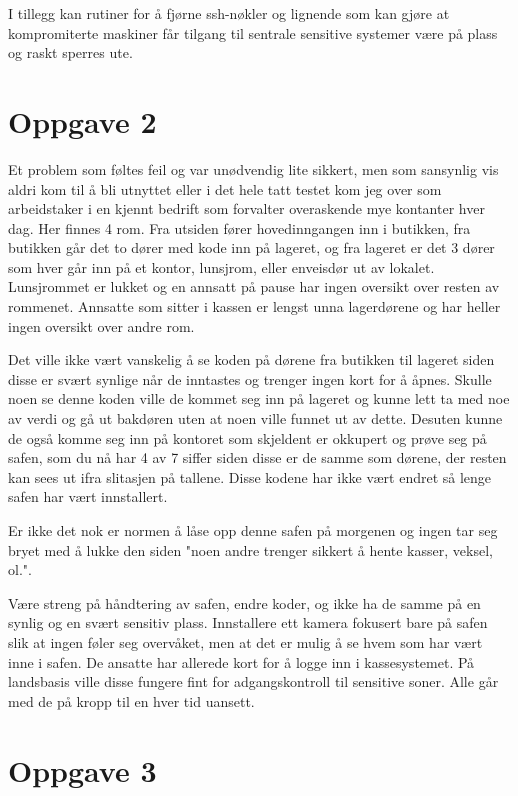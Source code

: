 \documentclass[12pt,a4paper]{article}
\begin{document}
I tillegg kan rutiner for å fjørne ssh-nøkler og lignende som kan gjøre at kompromiterte maskiner får tilgang til sentrale sensitive systemer være på plass og raskt sperres ute.

\section*{Oppgave 2}
Et problem som føltes feil og var unødvendig lite sikkert, men som sansynlig vis aldri kom til å bli utnyttet eller i det hele tatt testet kom jeg over som arbeidstaker i en kjennt bedrift som forvalter overaskende mye kontanter hver dag. Her finnes 4 rom. Fra utsiden fører hovedinngangen inn i butikken, fra butikken går det to dører med kode inn på lageret, og fra lageret er det 3 dører som hver går inn på et kontor, lunsjrom, eller enveisdør ut av lokalet. Lunsjrommet er lukket og en annsatt på pause har ingen oversikt over resten av rommenet. Annsatte som sitter i kassen er lengst unna lagerdørene og har heller ingen oversikt over andre rom.

Det ville ikke vært vanskelig å se koden på dørene fra butikken til lageret siden disse er svært synlige når de inntastes og trenger ingen kort for å åpnes. Skulle noen se denne koden ville de kommet seg inn på lageret og kunne lett ta med noe av verdi og gå ut bakdøren uten at noen ville funnet ut av dette. Desuten kunne de også komme seg inn på kontoret som skjeldent er okkupert og prøve seg på safen, som du nå har 4 av 7 siffer siden disse er de samme som dørene, der resten kan sees ut ifra slitasjen på tallene. Disse kodene har ikke vært endret så lenge safen har vært innstallert.

Er ikke det nok er normen å låse opp denne safen på morgenen og ingen tar seg bryet med å lukke den siden "noen andre trenger sikkert å hente kasser, veksel, ol.".

Være streng på håndtering av safen, endre koder, og ikke ha de samme på en synlig og en svært sensitiv plass. Innstallere ett kamera fokusert bare på safen slik at ingen føler seg overvåket, men at det er mulig å se hvem som har vært inne i safen. De ansatte har allerede kort for å logge inn i kassesystemet. På landsbasis ville disse fungere fint for adgangskontroll til sensitive soner. Alle går med de på kropp til en hver tid uansett.

\section*{Oppgave 3}
\end{document}
